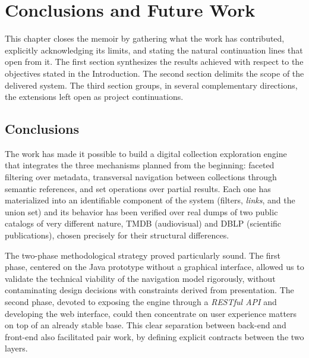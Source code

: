 \chapter*{Conclusions and Future Work}
\label{cap:conclusions}


This chapter closes the memoir by gathering what the work has contributed, explicitly
acknowledging its limits, and stating the natural continuation lines that open from it. The
first section synthesizes the results achieved with respect to the objectives stated in the
Introduction. The second section delimits the scope of the delivered system. The third section
groups, in several complementary directions, the extensions left open as project continuations.

\section*{Conclusions}

The work has made it possible to build a digital collection exploration engine that integrates
the three mechanisms planned from the beginning: faceted filtering over metadata, transversal
navigation between collections through semantic references, and set operations over partial
results. Each one has materialized into an identifiable component of the system (filters,
\textit{links}, and the union set) and its behavior has been verified over real dumps of two
public catalogs of very different nature, TMDB (audiovisual) and DBLP (scientific publications),
chosen precisely for their structural differences.

The two-phase methodological strategy proved particularly sound. The first phase, centered on
the Java prototype without a graphical interface, allowed us to validate the technical viability
of the navigation model rigorously, without contaminating design decisions with constraints
derived from presentation. The second phase, devoted to exposing the engine through a
\textit{RESTful API} and developing the web interface, could then concentrate on user experience
matters on top of an already stable base. This clear separation between back-end and front-end
also facilitated pair work, by defining explicit contracts between the two layers.

